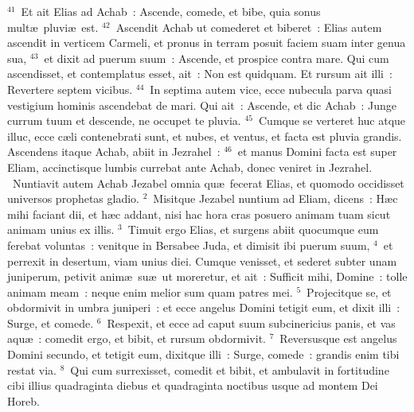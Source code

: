 ${}^{41}$~Et ait Elias ad Achab~: Ascende, comede, et bibe, quia sonus mult\ae\ pluvi\ae\ est.
${}^{42}$~Ascendit Achab ut comederet et biberet~: Elias autem ascendit in verticem Carmeli, et pronus in terram posuit faciem suam inter genua sua,
${}^{43}$~et dixit ad puerum suum~: Ascende, et prospice contra mare. Qui cum ascendisset, et contemplatus esset, ait~: Non est quidquam. Et rursum ait illi~: Revertere septem vicibus.
${}^{44}$~In septima autem vice, ecce nubecula parva quasi vestigium hominis ascendebat de mari. Qui ait~: Ascende, et dic Achab~: Junge currum tuum et descende, ne occupet te pluvia.
${}^{45}$~Cumque se verteret huc atque illuc, ecce c\ae li contenebrati sunt, et nubes, et ventus, et facta est pluvia grandis. Ascendens itaque Achab, abiit in Jezrahel~:
${}^{46}$~et manus Domini facta est super Eliam, accinctisque lumbis currebat ante Achab, donec veniret in Jezrahel.
~Nuntiavit autem Achab Jezabel omnia qu\ae\ fecerat Elias, et quomodo occidisset universos prophetas gladio.
${}^{2}$~Misitque Jezabel nuntium ad Eliam, dicens~: H\ae c mihi faciant dii, et h\ae c addant, nisi hac hora cras posuero animam tuam sicut animam unius ex illis.
${}^{3}$~Timuit ergo Elias, et surgens abiit quocumque eum ferebat voluntas~: venitque in Bersabee Juda, et dimisit ibi puerum suum,
${}^{4}$~et perrexit in desertum, viam unius diei. Cumque venisset, et sederet subter unam juniperum, petivit anim\ae\ su\ae\ ut moreretur, et ait~: Sufficit mihi, Domine~: tolle animam meam~: neque enim melior sum quam patres mei.
${}^{5}$~Projecitque se, et obdormivit in umbra juniperi~: et ecce angelus Domini tetigit eum, et dixit illi~: Surge, et comede.
${}^{6}$~Respexit, et ecce ad caput suum subcinericius panis, et vas aqu\ae~: comedit ergo, et bibit, et rursum obdormivit.
${}^{7}$~Reversusque est angelus Domini secundo, et tetigit eum, dixitque illi~: Surge, comede~: grandis enim tibi restat via.
${}^{8}$~Qui cum surrexisset, comedit et bibit, et ambulavit in fortitudine cibi illius quadraginta diebus et quadraginta noctibus usque ad montem Dei Horeb.


